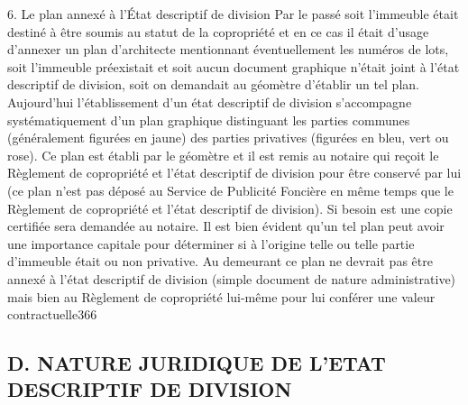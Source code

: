 		6. Le plan annexé à l’État descriptif de division
		Par le passé soit l’immeuble était destiné à être soumis au statut de la copropriété et en ce cas il était d’usage d’annexer un plan d’architecte mentionnant éventuellement les numéros de lots, soit l’immeuble préexistait et soit aucun document graphique n’était joint à l’état descriptif de division, soit on demandait au géomètre d’établir un tel plan.
		Aujourd’hui l’établissement d’un état descriptif de division s’accompagne systématiquement d’un plan graphique distinguant les parties communes (généralement figurées en jaune) des parties privatives (figurées en bleu, vert ou rose). Ce plan est établi par le géomètre et il est remis au notaire qui reçoit le Règlement de copropriété et l’état descriptif de division pour être conservé par lui (ce plan n’est pas déposé au Service de Publicité Foncière en même temps que le Règlement de copropriété et l’état descriptif de division). Si besoin est une copie certifiée sera demandée au notaire.
		Il est bien évident qu’un tel plan peut avoir une importance capitale pour déterminer si à l’origine telle ou telle partie d’immeuble était ou non privative.
		Au demeurant ce plan ne devrait pas être annexé à l’état descriptif de division (simple document de nature administrative) mais bien au Règlement de copropriété lui-même pour lui conférer une valeur contractuelle366

	\subsection{D. NATURE JURIDIQUE DE L’ETAT DESCRIPTIF DE DIVISION}

